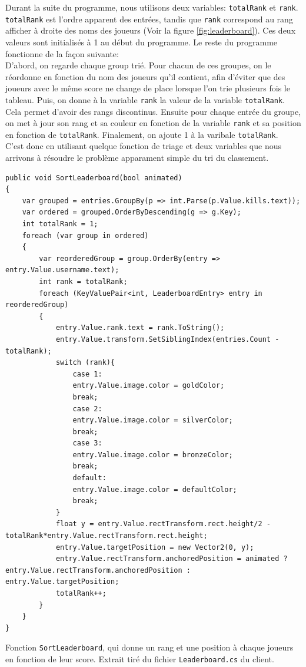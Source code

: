 \documentclass[a4paper]{article}
\begin{document}
Durant la suite du programme, nous utilisons deux variables: \texttt{totalRank} et \texttt{rank}. \texttt{totalRank} est l'ordre apparent des entrées, tandis que \texttt{rank} correspond au rang afficher à droite des noms des joueurs (Voir la figure \ref{fig:leaderboard}).  Ces deux valeurs sont initialisés à 1 au début du programme. Le reste du programme fonctionne de la façon suivante: \\
D'abord, on regarde chaque group trié. Pour chacun de ces groupes, on le réordonne en fonction du nom des joueurs qu'il contient, afin d'éviter que des joueurs avec le même score ne change de place lorsque l'on trie plusieurs fois le tableau. Puis, on donne à la variable \texttt{rank} la valeur de la variable \texttt{totalRank}. Cela permet d'avoir des rangs discontinus. Ensuite pour chaque entrée du groupe, on met à jour son rang et sa couleur en fonction de la variable \texttt{rank} et sa position en fonction de \texttt{totalRank}. Finalement, on ajoute 1 à la varibale \texttt{totalRank}. \\
C'est donc en utilisant quelque fonction de triage et deux variables que nous arrivons à résoudre le problème apparament simple du tri du classement.
\begin{listing}[H]
\begin{verbatim}
public void SortLeaderboard(bool animated)
{
    var grouped = entries.GroupBy(p => int.Parse(p.Value.kills.text));
    var ordered = grouped.OrderByDescending(g => g.Key);
    int totalRank = 1;
    foreach (var group in ordered)
    {
        var reorderedGroup = group.OrderBy(entry => entry.Value.username.text);
        int rank = totalRank;
        foreach (KeyValuePair<int, LeaderboardEntry> entry in reorderedGroup)
        {
            entry.Value.rank.text = rank.ToString();
            entry.Value.transform.SetSiblingIndex(entries.Count - totalRank);
            switch (rank){
                case 1:
                entry.Value.image.color = goldColor;
                break;
                case 2:
                entry.Value.image.color = silverColor;
                break;
                case 3:
                entry.Value.image.color = bronzeColor;
                break;
                default:
                entry.Value.image.color = defaultColor;
                break;
            }
            float y = entry.Value.rectTransform.rect.height/2 - totalRank*entry.Value.rectTransform.rect.height;
            entry.Value.targetPosition = new Vector2(0, y);
            entry.Value.rectTransform.anchoredPosition = animated ? entry.Value.rectTransform.anchoredPosition : entry.Value.targetPosition;
            totalRank++;
        }
    }
}
\end{verbatim}
\caption{Fonction \texttt{SortLeaderboard}, qui donne un rang et une position à chaque joueurs en fonction de leur score. Extrait tiré du fichier \texttt{Leaderboard.cs} du client.}
\label{extrait:leaderboard}
\end{listing}
\end{document}

